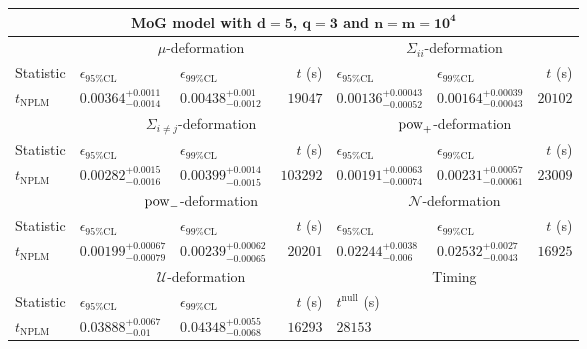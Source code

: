 \begin{tabular}{l|llr|llr}
	\toprule
	\multicolumn{7}{c}{{\bf MoG model with $\mathbf{d=5}$, $\mathbf{q=3}$ and $\mathbf{n=m=10^{4}}$}} \\
	\toprule
	\multicolumn{1}{c}{} & \multicolumn{3}{c}{$\mu$-deformation} & \multicolumn{3}{c}{$\Sigma_{ii}$-deformation} \\
	Statistic & $\epsilon_{95\%\mathrm{CL}}$ & $\epsilon_{99\%\mathrm{CL}}$ & $t$ (s) & $\epsilon_{95\%\mathrm{CL}}$ & $\epsilon_{99\%\mathrm{CL}}$ & $t$ (s) \\
	\midrule
	$t_{\mathrm{NPLM}}$ & $0.00364_{-0.0014}^{+0.0011}$ & $0.00438_{-0.0012}^{+0.001}$ & $19047$ & $0.00136_{-0.00052}^{+0.00043}$ & $0.00164_{-0.00043}^{+0.00039}$ & $20102$ \\
	\toprule
	\multicolumn{1}{c}{} & \multicolumn{3}{c}{$\Sigma_{i\neq j}$-deformation} & \multicolumn{3}{c}{$\rm{pow}_{+}$-deformation} \\
	Statistic & $\epsilon_{95\%\mathrm{CL}}$ & $\epsilon_{99\%\mathrm{CL}}$ & $t$ (s) & $\epsilon_{95\%\mathrm{CL}}$ & $\epsilon_{99\%\mathrm{CL}}$ & $t$ (s) \\
	\midrule
	$t_{\mathrm{NPLM}}$ & $0.00282_{-0.0016}^{+0.0015}$ & $0.00399_{-0.0015}^{+0.0014}$ & $103292$ & $0.00191_{-0.00074}^{+0.00063}$ & $0.00231_{-0.00061}^{+0.00057}$ & $23009$ \\
	\toprule
	\multicolumn{1}{c}{} & \multicolumn{3}{c}{$\rm{pow}_{-}$-deformation} & \multicolumn{3}{c}{$\mathcal{N}$-deformation} \\
	Statistic & $\epsilon_{95\%\mathrm{CL}}$ & $\epsilon_{99\%\mathrm{CL}}$ & $t$ (s) & $\epsilon_{95\%\mathrm{CL}}$ & $\epsilon_{99\%\mathrm{CL}}$ & $t$ (s) \\
	\midrule
	$t_{\mathrm{NPLM}}$ & $0.00199_{-0.00079}^{+0.00067}$ & $0.00239_{-0.00065}^{+0.00062}$ & $20201$ & $0.02244_{-0.006}^{+0.0038}$ & $0.02532_{-0.0043}^{+0.0027}$ & $16925$ \\
	\toprule
	\multicolumn{1}{c}{} & \multicolumn{3}{c}{$\mathcal{U}$-deformation} & \multicolumn{3}{c}{Timing} \\
	Statistic & $\epsilon_{95\%\mathrm{CL}}$ & $\epsilon_{99\%\mathrm{CL}}$ & $t$ (s) & $t^{\mathrm{null}}$ (s) \\
	\midrule
	$t_{\mathrm{NPLM}}$ & $0.03888_{-0.01}^{+0.0067}$ & $0.04348_{-0.0068}^{+0.0055}$ & $16293$ & $28153$ \\
	\bottomrule
\end{tabular}